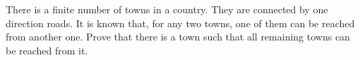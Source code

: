 There is a finite number of towns in a country. They are connected by one direction roads. It is known that, for any two towns, one of them can be reached from another one. Prove that there is a town such that all remaining towns can be reached from it.